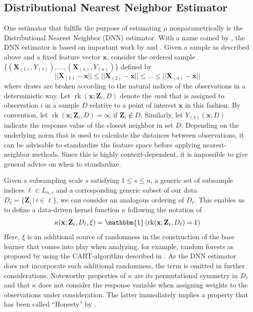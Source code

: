 \documentclass[letterpaper,10pt]{article}
\numberwithin{equation}{section}
\numberwithin{thm}{section}
\numberwithin{lem}{section}
\numberwithin{cor}{section}
\newcommand{\1}{\mathbb{1}}
\begin{document}
\subsection{Distributional Nearest Neighbor Estimator}
One estimator that fulfills the purpose of estimating $\mu$ nonparametrically is the Distributional Nearest Neighbor (DNN) estimator.
With a name coined by \citet{demirkaya_optimal_2024}, the DNN estimator is based on important work by \citet{steele_exact_2009} and \citet{biau_rate_2010}.
Given a sample as described above and a fixed feature vector $\mathbf{x}$, consider the ordered sample $\{(\mathbf{X}_{(1)}, Y_{(1)}), \dotsc, (\mathbf{X}_{(n)}, Y_{(n)})\}$ defined by
\begin{equation}\label{ordering}
	||\mathbf{X}_{(1)} - \mathbf{x}|| \leq ||\mathbf{X}_{(2)} - \mathbf{x}|| \leq \dotsc \leq ||\mathbf{X}_{(n)} - \mathbf{x}||
\end{equation}
where draws are broken according to the natural indices of the observations in a deterministic way.
Let $\operatorname{rk}(\mathbf{x}; \mathbf{Z}_i, D)$ denote the \textit{rank} that is assigned to observation $i$ in a sample $D$ relative to a point of interest $\mathbf{x}$ in this fashion.
By convention, let $\operatorname{rk}(\mathbf{x}; \mathbf{Z}_i, D) = \infty$ if $\mathbf{Z}_i \not\in D$.
Similarly, let $Y_{(1)}(\mathbf{x}; D)$ indicate the response value of the closest neighbor in set $D$.
Depending on the underlying norm that is used to calculate the distances between observations, it can be advisable to standardize the feature space before applying nearest-neighbor methods.
Since this is highly context-dependent, it is impossible to give general advice on when to standardize.

Given a subsampling scale $s$ satisfying $1 \leq s \leq n$, a generic set of subsample indices $\ell \in L_{n,s}$ and a corresponding generic subset of our data $D_{\ell} = \{\mathbf{Z}_i \, | \, i \in \ell\}$, we can consider an analogous ordering of $D_{\ell}$.
This enables us to define a data-driven kernel function $\kappa$ following the notation of \citet{ritzwoller_uniform_2024}.
\begin{equation}
	\kappa(\mathbf{x}; \mathbf{Z}_i, D_{\ell}, \xi)
	= \mathbbm{1}\left(\operatorname{rk}(\mathbf{x}; \mathbf{Z}_i, D_{\ell}) = 1\right)
\end{equation}
Here, $\xi$ is an additional source of randomness in the construction of the base learner that comes into play when analyzing, for example, random forests as proposed by \citet{breiman_random_2001} using the CART-algorithm described in \citet{breiman_classification_2017}.
As the DNN estimator does not incorporate such additional randomness, the term is omitted in further considerations.
Noteworthy properties of $\kappa$ are its permutational symmetry in $D_{\ell}$ and that $\kappa$ does not consider the response variable when assigning weights to the observations under consideration.
The latter immediately implies a property that has been called ``Honesty'' by \citet{wager_estimation_2018}.
\end{document}

